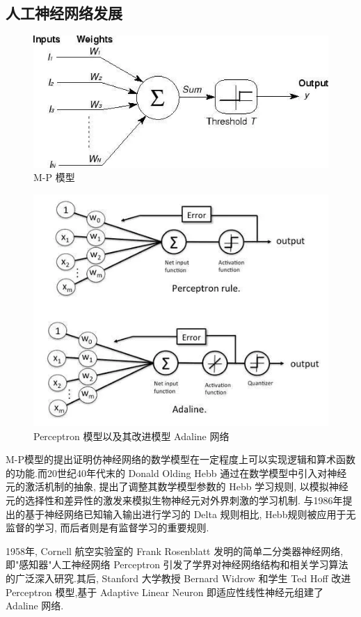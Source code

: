 \subsection{人工神经网络发展}
\begin{figure}
	\includegraphics[scale=0.7]{Figures/mpmodel.png}
	\caption{M-P 模型}
\end{figure}
\begin{figure}
	\includegraphics[scale=0.7]{Figures/perceptron.png}
	\caption{Perceptron 模型以及其改进模型 Adaline 网络}
\end{figure}

M-P模型的提出证明仿神经网络的数学模型在一定程度上可以实现逻辑和算术函数的功能.而20世纪40年代末的 Donald Olding Hebb 通过在数学模型中引入对神经元的激活机制的抽象, 提出了调整其数学模型参数的 Hebb 学习规则, 以模拟神经元的选择性和差异性的激发来模拟生物神经元对外界刺激的学习机制. 与1986年提出的基于神经网络已知输入输出进行学习的 Delta 规则相比, Hebb规则被应用于无监督的学习, 而后者则是有监督学习的重要规则.

1958年, Cornell 航空实验室的 Frank Rosenblatt 发明的简单二分类器神经网络,即"感知器"人工神经网络 Perceptron 引发了学界对神经网络结构和相关学习算法的广泛深入研究.其后, Stanford 大学教授 Bernard Widrow 和学生 Ted Hoff 改进Perceptron 模型,基于 Adaptive Linear Neuron 即适应性线性神经元组建了 Adaline 网络.

